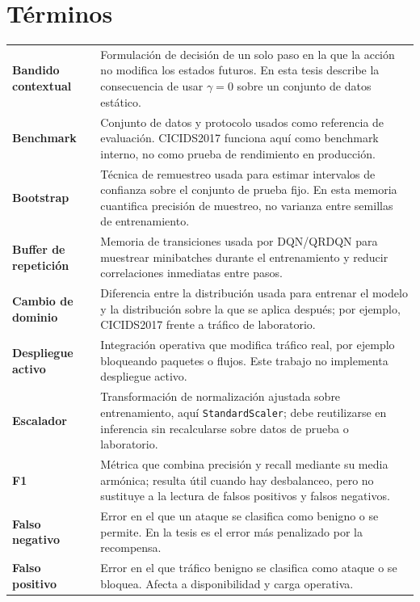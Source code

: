 \section*{Términos}

\begin{longtable}{@{}p{3.8cm}p{9.6cm}@{}}
\textbf{Bandido contextual} & Formulación de decisión de un solo paso en la que la acción no modifica los estados futuros. En esta tesis describe la consecuencia de usar $\gamma = 0$ sobre un conjunto de datos estático. \\[2pt]
\textbf{Benchmark} & Conjunto de datos y protocolo usados como referencia de evaluación. CICIDS2017 funciona aquí como benchmark interno, no como prueba de rendimiento en producción. \\[2pt]
\textbf{Bootstrap} & Técnica de remuestreo usada para estimar intervalos de confianza sobre el conjunto de prueba fijo. En esta memoria cuantifica precisión de muestreo, no varianza entre semillas de entrenamiento. \\[2pt]
\textbf{Buffer de repetición} & Memoria de transiciones usada por DQN/QRDQN para muestrear minibatches durante el entrenamiento y reducir correlaciones inmediatas entre pasos. \\[2pt]
\textbf{Cambio de dominio} & Diferencia entre la distribución usada para entrenar el modelo y la distribución sobre la que se aplica después; por ejemplo, CICIDS2017 frente a tráfico de laboratorio. \\[2pt]
\textbf{Despliegue activo} & Integración operativa que modifica tráfico real, por ejemplo bloqueando paquetes o flujos. Este trabajo no implementa despliegue activo. \\[2pt]
\textbf{Escalador} & Transformación de normalización ajustada sobre entrenamiento, aquí \texttt{StandardScaler}; debe reutilizarse en inferencia sin recalcularse sobre datos de prueba o laboratorio. \\[2pt]
\textbf{F1} & Métrica que combina precisión y recall mediante su media armónica; resulta útil cuando hay desbalanceo, pero no sustituye a la lectura de falsos positivos y falsos negativos. \\[2pt]
\textbf{Falso negativo} & Error en el que un ataque se clasifica como benigno o se permite. En la tesis es el error más penalizado por la recompensa. \\[2pt]
\textbf{Falso positivo} & Error en el que tráfico benigno se clasifica como ataque o se bloquea. Afecta a disponibilidad y carga operativa. \\[2pt]

\end{longtable}
